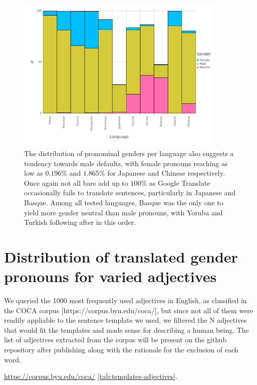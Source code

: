 \documentclass[fleqn,10pt]{article}
\begin{document}
\begin{figure}[H]
	\centering
	\includegraphics[width=10cm]{pictures/gender-by-language}
	\caption{The distribution of pronominal genders per language also suggests a tendency towards male defaults, with female pronouns reaching as low as $0.196\%$ and $1.865\%$ for Japanese and Chinese respectively. Once again not all bars add up to $100\%$ as Google Translate occasionally fails to translate sentences, particularly in Japanese and Basque. Among all tested languages, Basque was the only one to yield more gender neutral than male pronouns, with Yoruba and Turkish following after in this order.}
	\label{fig:gender-by-language}
\end{figure}

\section{Distribution of translated gender pronouns for varied adjectives}

We queried the 1000 most frequently used adjectives in English, as classified in the COCA corpus [https://corpus.byu.edu/coca/], but since not all of them were readily appliable to the sentence template we used, we filtered the N adjectives that would fit the templates and made sense for describing a human being. The list of adjectives extracted from the corpus will be present on the github repository after publishing along with the rationale for the exclusion of each word.

 \url{https://corpus.byu.edu/coca/} \ref{tab:templates-adjectives}.
\end{document}
